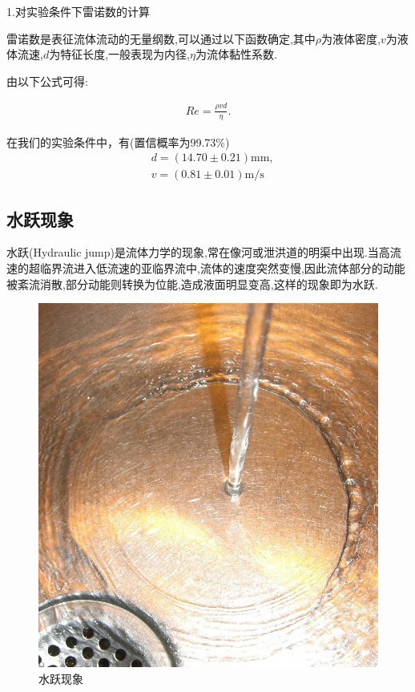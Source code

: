 \documentclass[UTF8]{gapd}
\begin{document}
\noindent 1.对实验条件下雷诺数的计算

雷诺数是表征流体流动的无量纲数,可以通过以下函数确定,其中$\rho$为液体密度,$v$为液体流速,$d$为特征长度,一般表现为内径,$\eta$为流体黏性系数.

由以下公式可得:

\begin{align}
    Re=\frac{\rho vd}{\eta}.
\end{align}

在我们的实验条件中，有(置信概率为99.73\%)
\begin{align}
    &d=(14.70 \pm 0.21)\text{mm},\\
    &v=(0.81 \pm 0.01)\text{m/s}
\end{align}
\subsection{水跃现象}
水跃(Hydraulic jump)是流体力学的现象,常在像河或泄洪道的明渠中出现.当高流速的超临界流进入低流速的亚临界流中,流体的速度突然变慢,因此流体部分的动能被紊流消散,部分动能则转换为位能,造成液面明显变高,这样的现象即为水跃.\cite{wiki:water}

\begin{figure}[!htbp]%
  \centering
  \includegraphics[width=0.8\columnwidth]{images/shock_sink.jpg}
  \caption{水跃现象\cite{wiki:water}}
  \label{fig:unsinkable_disc_hudraulia_jump}%
\end{figure}
\end{document}
